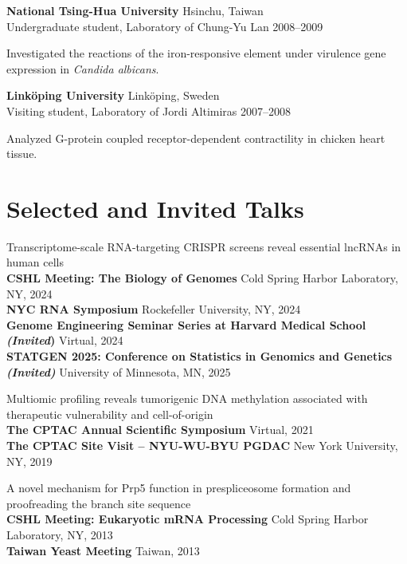 \documentclass[letterpaper,11pt]{cv}
\begin{document}
\begin{entrylist}
    \item \textbf{National Tsing-Hua University} \hfill Hsinchu, Taiwan\\
    Undergraduate student, Laboratory of Chung-Yu Lan \hfill
    2008--2009
    \begin{detaillist}
        \item Investigated the reactions of the iron-responsive element under virulence gene expression in \textit{Candida albicans}.
    \end{detaillist}
    
    \item \textbf{Linköping University} \hfill Linköping, Sweden\\
    Visiting student, Laboratory of Jordi Altimiras \hfill
    2007--2008
    \begin{detaillist}
        \item Analyzed G-protein coupled receptor-dependent contractility in chicken heart tissue.
    \end{detaillist}
    
    \end{entrylist}
    

\section{Selected and Invited Talks}
\begin{entrylist}
    \item \small{Transcriptome-scale RNA-targeting CRISPR screens reveal essential lncRNAs in human cells}\\
    \textbf{CSHL Meeting: The Biology of Genomes} \hfill Cold Spring Harbor Laboratory, NY, 2024 \\
    \textbf{NYC RNA Symposium} \hfill Rockefeller University, NY, 2024 \\
    \textbf{Genome Engineering Seminar Series at Harvard Medical School \textit{(Invited})} \hfill Virtual, 2024 \\
    \textbf{STATGEN 2025: Conference on Statistics in Genomics and Genetics \textit{(Invited)}}
    \hfill University of Minnesota, MN, 2025
    \item \small{Multiomic profiling reveals tumorigenic DNA methylation associated with therapeutic vulnerability and cell-of-origin}\\ \textbf{The CPTAC Annual Scientific Symposium} \hfill Virtual, 2021 \\
    \textbf{The CPTAC Site Visit – NYU-WU-BYU PGDAC} \hfill New York University, NY, 2019
    \item \small{A novel mechanism for Prp5 function in prespliceosome formation and proofreading the branch site sequence}\\
    \textbf{CSHL Meeting: Eukaryotic mRNA Processing} \hfill Cold Spring Harbor Laboratory, NY, 2013 \\
    \textbf{Taiwan Yeast Meeting} \hfill Taiwan, 2013


\end{entrylist}
\end{document}
